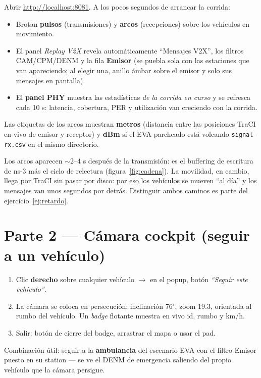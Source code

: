 \documentclass[11pt,a4paper]{article}
\begin{document}
\begin{ennavegador}
Abrir \url{http://localhost:8081}. A los pocos segundos de arrancar la
corrida:
\begin{itemize}[leftmargin=1.4em, itemsep=1pt]
  \item Brotan \textbf{pulsos} (transmisiones) y \textbf{arcos} (recepciones)
        sobre los vehículos en movimiento.
  \item El panel \emph{Replay V2X} revela automáticamente ``Mensajes V2X'',
        los filtros CAM/CPM/DENM y la fila \textbf{Emisor} (se puebla sola con
        las estaciones que van apareciendo; al elegir una, anillo ámbar sobre
        el emisor y solo sus mensajes en pantalla).
  \item El \textbf{panel PHY} muestra las estadísticas \emph{de la corrida en
        curso} y se refresca cada 10 s: latencia, cobertura, PER y utilización
        van creciendo con la corrida.
\end{itemize}
Las etiquetas de los arcos muestran \textbf{metros} (distancia entre las
posiciones TraCI en vivo de emisor y receptor) y \textbf{dBm} si el EVA
parcheado está volcando \texttt{signal-rx.csv} en el mismo directorio.
\end{ennavegador}

\begin{notabox}
Los arcos aparecen $\sim$2--4 s después de la transmisión: es el buffering de
escritura de ns-3 más el ciclo de relectura (figura~\ref{fig:cadena}). La
movilidad, en cambio, llega por TraCI sin pasar por disco: por eso los
vehículos se mueven ``al día'' y los mensajes van unos segundos por detrás.
Distinguir ambos caminos es parte del ejercicio~\ref{ej:retardo}.
\end{notabox}

\section{Parte 2 --- Cámara cockpit (seguir a un vehículo)}

\begin{ennavegador}
\begin{enumerate}[leftmargin=1.6em, itemsep=1pt]
  \item Clic \textbf{derecho} sobre cualquier vehículo $\to$ en el popup,
        botón \emph{``Seguir este vehículo''}.
  \item La cámara se coloca en persecución: inclinación 76$^{\circ}$, zoom
        19.3, orientada al rumbo del vehículo. Un \emph{badge} flotante
        muestra en vivo id, rumbo y km/h.
  \item Salir: botón de cierre del badge, arrastrar el mapa o usar el pad.
\end{enumerate}
Combinación útil: seguir a la \textbf{ambulancia} del escenario EVA con el
filtro Emisor puesto en su station --- se ve el DENM de emergencia saliendo
del propio vehículo que la cámara persigue.
\end{ennavegador}
\end{document}
